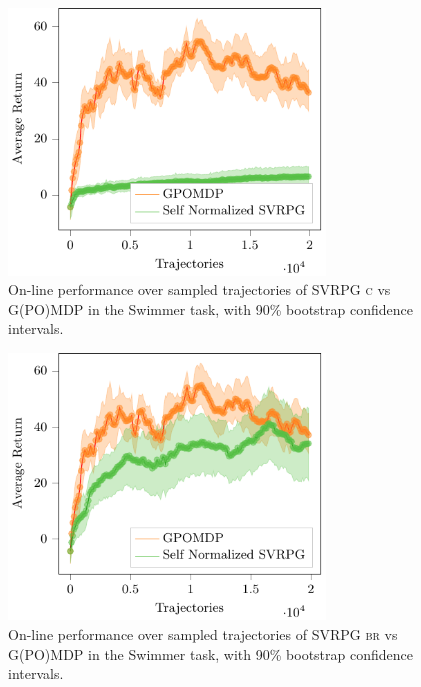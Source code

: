 \begin{figure}[h]
	\begin{minipage}[h]{1\textwidth}
		\centering
		\includegraphics[width=0.75\textwidth]{Images/Experiments/swimmer_GPOMDP_vs_SN_SVRPG_C.pdf}
		\vspace{-0.1in}
		\caption{On-line performance over sampled trajectories of \acs{SVRPG} \textsc{c} vs G(PO)MDP in the Swimmer task, with 90\% bootstrap confidence intervals.}
		\label{fig:swimmerseven}
	\end{minipage}
	\vspace{-0.15in}
\end{figure}

\begin{figure}[h]
	\begin{minipage}[h]{1\textwidth}
		\centering
		\includegraphics[width=0.75\textwidth]{Images/Experiments/swimmer_GPOMDP_vs_SN_SVRPG_B_reuse.pdf}
		\vspace{-0.1in}
		\caption{On-line performance over sampled trajectories of \acs{SVRPG} \textsc{br} vs G(PO)MDP in the Swimmer task, with 90\% bootstrap confidence intervals.}
		\label{fig:swimmereight}
	\end{minipage}
	\vspace{-0.15in}
\end{figure}


